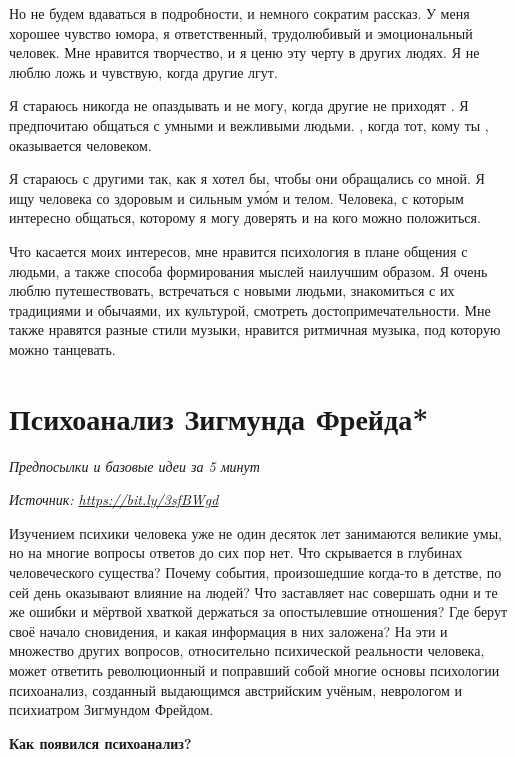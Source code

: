 Но не будем вдаваться в подробности, и немного сократим рассказ. У меня хорошее чувство юмора, я ответственный, трудолюбивый и эмоциональный человек. Мне нравится творчество, и я ценю эту черту в других людях. Я не люблю ложь и чувствую, когда другие лгут.

Я стараюсь никогда не опаздывать и  не могу, когда другие не приходят . Я предпочитаю общаться с умными и вежливыми людьми. , когда тот, кому ты , оказывается  человеком.

Я стараюсь  с другими так, как я хотел бы, чтобы они обращались со мной. Я ищу человека со здоровым и сильным ум\'{о}м и телом. Человека, с которым интересно общаться, которому я могу доверять и на кого можно положиться.

Что касается моих интересов, мне нравится психология в плане общения с людьми, а также способа формирования мыслей наилучшим образом. Я очень люблю путешествовать, встречаться с новыми людьми, знакомиться с их традициями и обычаями, их культурой, смотреть достопримечательности. Мне также нравятся разные стили музыки, нравится ритмичная музыка, под которую можно танцевать.

\newpage
\section{Психоанализ Зигмунда Фрейда*}

\textit{Предпосылки и базовые идеи за 5 минут}

\textit{Источник: \url{https://bit.ly/3sfBWgd}}

Изучением психики человека уже не один десяток лет занимаются великие умы, но на многие вопросы ответов до сих пор нет. Что скрывается в глубинах человеческого существа? Почему события, произошедшие когда-то в детстве, по сей день оказывают влияние на людей? Что заставляет нас совершать одни и те же ошибки и мёртвой хваткой держаться за опостылевшие отношения? Где берут своё начало сновидения, и какая информация в них заложена? На эти и множество других вопросов, относительно психической реальности человека, может ответить революционный и поправший собой многие основы психологии психоанализ, созданный выдающимся австрийским учёным, неврологом и психиатром Зигмундом Фрейдом.

\textbf{Как появился психоанализ?}

